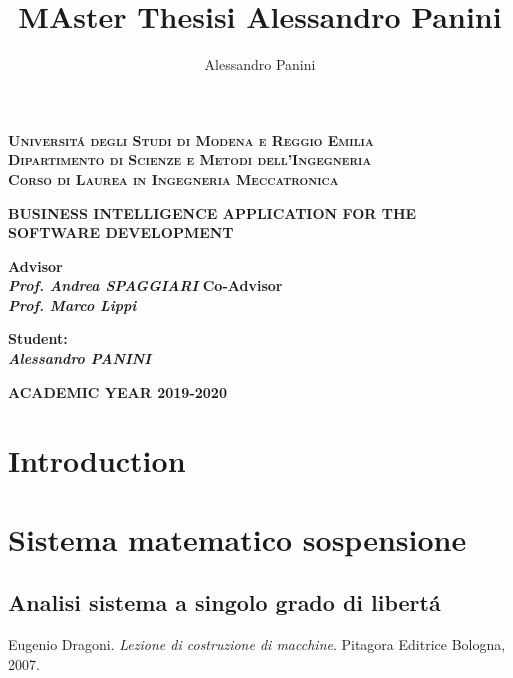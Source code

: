 \documentclass[a4paper,12pt,twoside]{report}
\title{\textbf{MAster Thesisi Alessandro Panini}}
\date{}
\author{Alessandro Panini}
\newlength{\drop}%
\newcommand*{\titleSal}%
{
	\begin{center}  
		\begingroup
		{\Large\bfseries\rmfamily\scshape Universit\'a degli Studi di Modena e Reggio Emilia}\\
		{\Large\bfseries\rmfamily\scshape Dipartimento di Scienze e Metodi dell'Ingegneria }\\[\baselineskip]
		\vspace*{1cm}
		\vspace*{\drop}
		{\Large\bfseries\rmfamily\scshape Corso di Laurea in Ingegneria Meccatronica}\\[\baselineskip]
		\vspace*{\drop}
		
		\vspace*{3cm}
		
		\linespread{3}
		{\LARGE\bfseries\rmfamily BUSINESS INTELLIGENCE APPLICATION FOR THE SOFTWARE DEVELOPMENT}\\
		\vspace*{4cm}
		
	\end{center}
	\vspace*{2cm}   
	\begin{minipage}{0.4\textwidth}
		\begin{flushleft}
			{\small\bfseries Advisor}\\
			{\bfseries\itshape Prof. Andrea SPAGGIARI }
			{\small\bfseries Co-Advisor}\\
			{\bfseries\itshape Prof. Marco Lippi }
		\end{flushleft}
	\end{minipage}
	\begin{minipage}{0.4\textwidth}
		\begin{flushright} 
			{\bfseries\small Student:}\\
			{\bfseries\itshape Alessandro PANINI}
		\end{flushright}
	\end{minipage}  
	\vfill
	
	{\large\bfseries\rmfamily ACADEMIC YEAR 2019-2020}
	
	\endgroup
}
\begin{document}
	
\titleSal
\pagestyle{plain}

\newcommand*\rot{\multicolumn{1}{R{45}{1em}}}

	
	\newpage
	
	
	\tableofcontents
	
\chapter*{Introduction}


	
		
		
\cleardoublepage
\chapter{Sistema matematico sospensione}
\section{Analisi sistema a singolo grado di libert\'a}

\begin{thebibliography}{9}
	
	Eugenio Dragoni. 
	\textit{Lezione di costruzione di macchine}.
	Pitagora Editrice Bologna, 2007.
	
\end{thebibliography}
\end{document}
